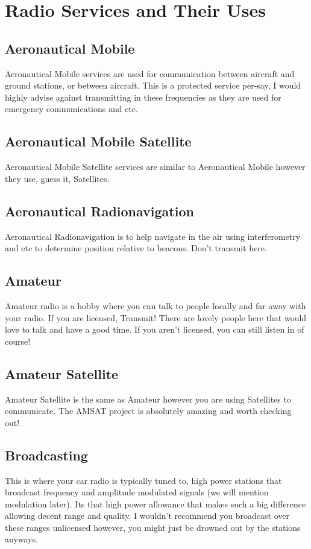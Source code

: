 \documentclass{book}
\begin{document}
    \chapter{Radio Services and Their Uses}
    \section{Aeronautical Mobile}
        Aeronautical Mobile services are used for communication between aircraft and ground stations, or between aircraft.
        This is a protected service per-say, I would highly advise against transmitting in these frequencies 
        as they are used for emergency communications and etc.
    \section{Aeronautical Mobile Satellite}
        Aeronautical Mobile Satellite services are similar to Aeronautical Mobile however they use, guess it, Satellites.
    \section{Aeronautical Radionavigation}
        Aeronautical Radionavigation is to help navigate in the air using interferometry and etc to determine position relative 
        to beacons. Don't transmit here.
    \section{Amateur}
        Amateur radio is a hobby where you can talk to people locally and far away with your radio.
        If you are licensed, Transmit! There are lovely people here that would love
        to talk and have a good time. If you aren't licensed, you can still listen in of course!
    \section{Amateur Satellite}
        Amateur Satellite is the same as Amateur however you are using Satellites to communicate. The AMSAT project is absolutely amazing and worth checking out!
    \section{Broadcasting}
        This is where your car radio is typically tuned to, high power stations that broadcast frequency and amplitude modulated signals (we will mention modulation later).
        Its that high power allowance that makes such a big difference allowing decent range and quality. I wouldn't recommend you broadcast over these ranges unlicensed however, you might just 
        be drowned out by the stations anyways. 
\end{document}
